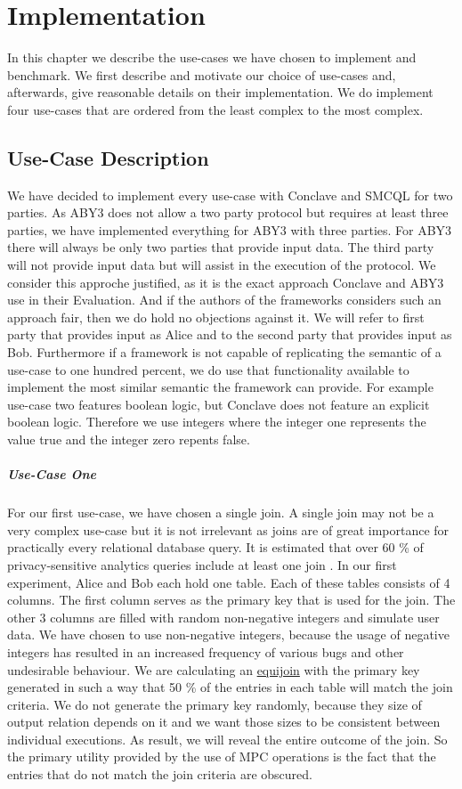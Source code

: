 \chapter{Implementation}
In this chapter we describe the use-cases we have chosen to implement and benchmark. We first describe and motivate our choice of use-cases and, afterwards, give reasonable details on their implementation. We do implement four use-cases that are ordered from the least complex to the most complex.
\section{Use-Case Description} 
We have decided to implement every use-case with Conclave and SMCQL for two parties. As ABY3 does not allow a two party protocol but requires at least three parties, we have implemented everything for ABY3 with three parties. For ABY3 there will always be only two parties that provide input data. The third party will not provide input data but will assist in the execution of the protocol. We consider this approche justified, as it is the exact approach Conclave and ABY3 use in their Evaluation. And if the authors of the frameworks considers such an approach fair, then we do hold no objections against it.  
We will refer to first party that provides input as Alice and to the second party that provides input as Bob. Furthermore if a framework is not capable of replicating the semantic of a use-case to one hundred percent, we do use that functionality available to implement the most similar semantic the framework can provide. For example use-case two features boolean logic, but Conclave does not feature an explicit boolean logic. Therefore we use integers where the integer one represents the value true and the integer zero repents false.   
\paragraph{Use-Case One}
For our first use-case, we have chosen a single join. A single join may not be a very complex use-case but it is not irrelevant as joins are of great importance for practically every relational database query. It is estimated that over 60 \% of privacy-sensitive analytics queries include at least one join \cite{johnson2017practical}. In our first experiment, Alice and Bob each hold one table. Each of these tables consists of 4 columns. The first column serves as the primary key that is used for the join. The other 3 columns are filled with random non-negative integers and simulate user data. We have chosen to use non-negative integers, because the usage of negative integers has resulted in an  increased frequency of various bugs and other undesirable behaviour. We are calculating an \hyperref[Databases]{equijoin}  with the primary key generated in such a way that 50 \% of the entries in each table will match the join criteria. We do not generate the primary key randomly, because they size of output relation depends on it and we want those sizes to be consistent between individual executions. As result, we will reveal the entire outcome of the join. So the primary utility provided by the use of MPC operations is the fact that the entries that do not match the join criteria are obscured.

